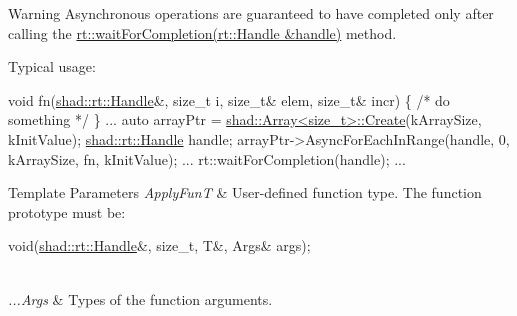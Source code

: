 \begin{DoxyWarning}{Warning}
Asynchronous operations are guaranteed to have completed only after calling the \hyperlink{namespaceshad_1_1rt_a6ea1d3672bac3a80032863b6732a0c0a}{rt\-::wait\-For\-Completion(rt\-::\-Handle \&handle)} method.
\end{DoxyWarning}
Typical usage\-: 
\begin{DoxyCode}
\textcolor{keywordtype}{void} fn(\hyperlink{classshad_1_1rt_1_1Handle}{shad::rt::Handle}&, \textcolor{keywordtype}{size\_t} i, \textcolor{keywordtype}{size\_t}& elem, \textcolor{keywordtype}{size\_t}& incr) \{
  \textcolor{comment}{/* do something */}
\}
...
auto arrayPtr = \hyperlink{classshad_1_1Array_a4ff830861f0ace4bf0a5e39e400b50f8}{shad::Array<size\_t>::Create}(kArraySize, kInitValue);
\hyperlink{classshad_1_1rt_1_1Handle}{shad::rt::Handle} handle;
arrayPtr->AsyncForEachInRange(handle, 0, kArraySize, fn, kInitValue);
...
rt::waitForCompletion(handle);
...
\end{DoxyCode}



\begin{DoxyTemplParams}{Template Parameters}
{\em Apply\-Fun\-T} & User-\/defined function type. The function prototype must be\-: 
\begin{DoxyCode}
void(\hyperlink{classshad_1_1rt_1_1Handle}{shad::rt::Handle}&, \textcolor{keywordtype}{size\_t}, T&, Args& args);
\end{DoxyCode}
 \\
\hline
{\em ...\-Args} & Types of the function arguments.\\
\hline
\end{DoxyTemplParams}

